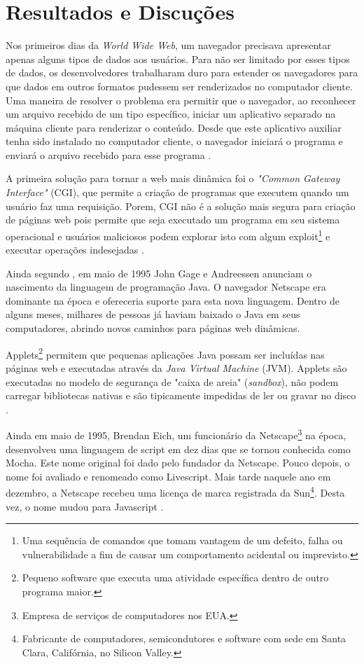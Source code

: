 \section{Resultados e Discuções}



Nos primeiros dias da \textit{World Wide Web}, um navegador precisava apresentar apenas alguns tipos de dados aos usuários. Para não ser limitado por esses tipos de dados, os desenvolvedores trabalharam duro para estender os navegadores para que dados em outros formatos pudessem ser renderizados no computador cliente. Uma maneira de resolver o problema era permitir que o navegador, ao reconhecer um arquivo recebido de um tipo específico, iniciar um aplicativo separado na máquina cliente para renderizar o conteúdo. Desde que este aplicativo auxiliar tenha sido instalado no computador cliente, o navegador iniciará o programa e enviará o arquivo recebido para esse programa \cite{zammetti2007brief}.

A primeira solução para tornar a web mais dinâmica foi o \textit{"Common Gateway Interface"} (CGI), que permite a criação de programas que executem quando um usuário faz uma requisição. Porem, CGI não é a solução mais segura para criação de páginas web pois permite que seja executado um programa em seu sistema operacional e usuários maliciosos podem explorar isto com algum exploit\footnote{Uma sequência de comandos que tomam vantagem de um defeito, falha ou vulnerabilidade a fim de causar um comportamento acidental ou imprevisto.} e executar operações indesejadas \cite{Asleson2006}.

Ainda segundo , em maio de 1995 John Gage e Andreessen anunciam o nascimento da linguagem de programação Java. O navegador Netscape era dominante na época e ofereceria suporte para esta nova linguagem. Dentro de alguns meses, milhares de pessoas já haviam baixado o Java em seus computadores, abrindo novos caminhos para páginas web dinâmicas.

Applets\footnote{Pequeno software que executa uma atividade específica dentro de outro programa maior.} permitem que pequenas aplicações Java possam ser incluídas nas páginas web e executadas através da \textit{Java Virtual Machine} (JVM). Applets são executadas no modelo de segurança de "caixa de areia" (\textit{sandbox}), não podem carregar bibliotecas nativas e são tipicamente impedidas de ler ou gravar no disco \cite{Asleson2006}.

Ainda em maio de 1995, Brendan Eich, um funcionário da Netscape\footnote{Empresa de serviços de computadores nos EUA.} na época, desenvolveu uma linguagem de script em dez dias que se tornou conhecida como Mocha. Este nome original foi dado pelo fundador da Netscape. Pouco depois, o nome foi avaliado e renomeado como Livescript. Mais tarde naquele ano em dezembro, a Netscape recebeu uma licença de marca registrada da Sun\footnote{Fabricante de computadores, semicondutores e software com sede em Santa Clara, Califórnia, no Silicon Valley.}. Desta vez, o nome mudou para Javascript \cite{neer2013history}.

